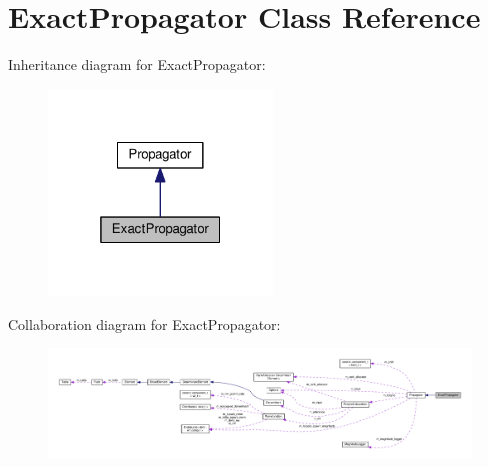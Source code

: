 \hypertarget{classExactPropagator}{}\section{Exact\+Propagator Class Reference}
\label{classExactPropagator}


Inheritance diagram for Exact\+Propagator\+:\nopagebreak
\begin{figure}[H]
\begin{center}
\leavevmode
\includegraphics[width=169pt]{classExactPropagator__inherit__graph}
\end{center}
\end{figure}


Collaboration diagram for Exact\+Propagator\+:\nopagebreak
\begin{figure}[H]
\begin{center}
\leavevmode
\includegraphics[width=350pt]{classExactPropagator__coll__graph}
\end{center}
\end{figure}
